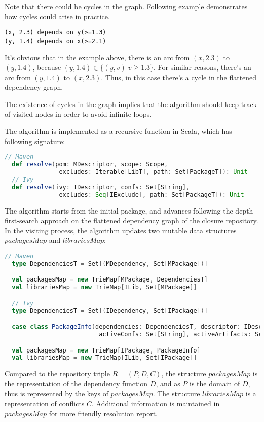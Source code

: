 Note that there could be cycles in the graph. Following example demonstrates how cycles could arise in practice.

\begin{verbatim}
(x, 2.3) depends on y(>=1.3)
(y, 1.4) depends on x(>=2.1)
\end{verbatim}

It's obvious that in the example above, there is an arc from $(x, 2.3)$ to $(y, 1.4)$, because $(y, 1.4) \in \{(y, v) | v \geq 1.3 \}$. For similar reasons, there's an arc from $(y, 1.4)$ to $(x, 2.3)$. Thus, in this case there's a cycle in the flattened dependency graph.

The existence of cycles in the graph implies that the algorithm should keep track of visited nodes in order to avoid infinite loops.

The algorithm is implemented as a recursive function in Scala, which has following signature:
\begin{lstlisting}[language=Scala]
  // Maven
  def resolve(pom: MDescriptor, scope: Scope,
               excludes: Iterable[LibT], path: Set[PackageT]): Unit
  // Ivy
  def resolve(ivy: IDescriptor, confs: Set[String],
               excludes: Seq[IExclude], path: Set[PackageT]): Unit
\end{lstlisting}

The algorithm starts from the initial package, and advances following the depth-first-search approach on the flattened dependency graph of the closure repository. In the visiting process, the algorithm updates two mutable data structures $packagesMap$ and $librariesMap$:

\begin{lstlisting}[language=Scala]
  // Maven
  type DependenciesT = Set[(MDependency, Set[MPackage])]

  val packagesMap = new TrieMap[MPackage, DependenciesT]
  val librariesMap = new TrieMap[ILib, Set[MPackage]]

  // Ivy
  type DependenciesT = Set[(IDependency, Set[IPackage])]

  case class PackageInfo(dependencies: DependenciesT, descriptor: IDescriptor,
                          activeConfs: Set[String], activeArtifacts: Set[String])

  val packagesMap = new TrieMap[IPackage, PackageInfo]
  val librariesMap = new TrieMap[ILib, Set[IPackage]]
\end{lstlisting}

Compared to the repository triple $R = (P, D, C)$, the structure $packagesMap$ is the representation of the dependency function $D$, and as $P$ is the domain of $D$, thus is represented by the keys of $packagesMap$. The structure $librariesMap$ is a representation of conflicts $C$. Additional information is maintained in $packagesMap$ for more friendly resolution report.

